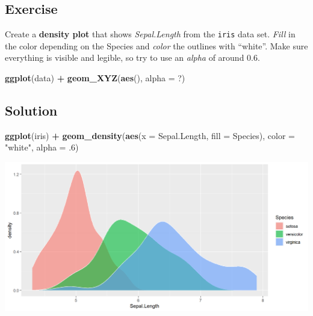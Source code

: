 \documentclass[
]{book}
\newenvironment{Shaded}{\begin{snugshade}}{\end{snugshade}}
\newcommand{\AttributeTok}[1]{\textcolor[rgb]{0.13,0.29,0.53}{#1}}
\newcommand{\DecValTok}[1]{\textcolor[rgb]{0.00,0.00,0.81}{#1}}
\newcommand{\FunctionTok}[1]{\textcolor[rgb]{0.13,0.29,0.53}{\textbf{#1}}}
\newcommand{\NormalTok}[1]{#1}
\newcommand{\SpecialCharTok}[1]{\textcolor[rgb]{0.81,0.36,0.00}{\textbf{#1}}}
\newcommand{\StringTok}[1]{\textcolor[rgb]{0.31,0.60,0.02}{#1}}
\begin{document}
\subsection{Exercise}\label{exercise-1}

Create a \textbf{density plot} that shows \emph{Sepal.Length} from the \texttt{iris} data set.
\emph{Fill} in the color depending on the Species and \emph{color} the outlines with ``white''.
Make sure everything is visible and legible, so try to use an \emph{alpha} of around 0.6.

\begin{Shaded}
\begin{Highlighting}[]
\FunctionTok{ggplot}\NormalTok{(data) }\SpecialCharTok{+} 
  \FunctionTok{geom\_XYZ}\NormalTok{(}\FunctionTok{aes}\NormalTok{(), }\AttributeTok{alpha =}\NormalTok{ ?)}
\end{Highlighting}
\end{Shaded}

\subsection{Solution}\label{solution}

\begin{Shaded}
\begin{Highlighting}[]
\FunctionTok{ggplot}\NormalTok{(iris) }\SpecialCharTok{+} 
  \FunctionTok{geom\_density}\NormalTok{(}\FunctionTok{aes}\NormalTok{(}\AttributeTok{x =}\NormalTok{ Sepal.Length, }\AttributeTok{fill =}\NormalTok{ Species), }
               \AttributeTok{color =} \StringTok{"white"}\NormalTok{, }\AttributeTok{alpha =}\NormalTok{ .}\DecValTok{6}\NormalTok{)}
\end{Highlighting}
\end{Shaded}

\begin{flushleft}\includegraphics{_main_files/figure-html/solxyz-1} \end{flushleft}
\end{document}

